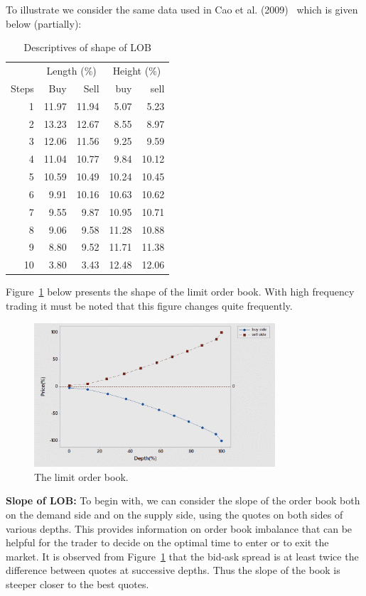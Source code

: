 To illustrate we consider the same data used in Cao et al. (2009)~\cite[Table II]{caohanschwang} which is given below (partially):
	\begin{table}[!ht]
	\centering
	\caption{Descriptives of shape of LOB\label{tab:descLOB}}
	\begin{tabular}{rrrrr}
	& \multicolumn{2}{c}{Length (\%)} & \multicolumn{2}{c}{Height (\%)} \\
	Steps & Buy & Sell & buy & sell \\
	1 & 11.97 & 11.94 & 5.07 & 5.23 \\
	2 & 13.23 & 12.67 & 8.55 & 8.97 \\
	3 & 12.06 & 11.56 & 9.25 & 9.59 \\
	4 & 11.04 & 10.77 & 9.84 & 10.12 \\
	5 & 10.59 & 10.49 & 10.24 & 10.45 \\
	6 & 9.91 & 10.16 & 10.63 & 10.62 \\
	7 & 9.55 & 9.87 & 10.95 & 10.71 \\
	8 & 9.06 & 9.58 & 11.28 & 10.88 \\
	9 & 8.80 & 9.52 & 11.71 & 11.38 \\
	10 & 3.80 & 3.43 & 12.48 & 12.06
	\end{tabular}
	\end{table}

Figure~\ref{fig:presentshape} below presents the shape of the limit order book. With high frequency trading it must be noted that this figure changes quite frequently. 
	\begin{figure}[H]
	\centering
	\includegraphics[width=0.8\textwidth]{chapters/chapter_trade_data_models/figures/lobshape.png} 
	\caption{The limit order book.\label{fig:presentshape}}
	\end{figure}


\noindent \textbf{Slope of LOB:} To begin with, we can consider the slope of the order book both on the demand side and on the supply side, using the quotes on both sides of various depths. This provides information on order book imbalance that can be helpful for the trader to decide on the optimal time to enter or to exit the market. It is observed from Figure~\ref{fig:presentshape} that the bid-ask spread is at least twice the difference between quotes at successive depths. Thus the slope of the book is steeper closer to the best quotes. \twomedskip


